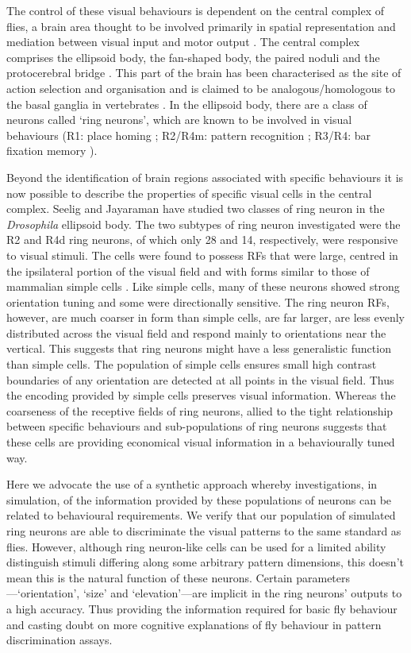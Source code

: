 The control of these visual behaviours is dependent on the central complex of flies, a brain area thought to be involved primarily in spatial representation and mediation between visual input and motor output \cite{Pfeiffer2014}.
The central complex comprises the ellipsoid body, the fan-shaped body, the paired noduli and the protocerebral bridge \cite{Young2010}.
This part of the brain has been characterised as the site of action selection and organisation and is claimed to be analogous/homologous to the basal ganglia in vertebrates \cite{Strausfeld2013}.
In the ellipsoid body, there are a class of neurons called `ring neurons', which are known to be involved in visual behaviours (R1: place homing \cite{Ofstad2011,Sitaraman2010,Sitaraman2008}; R2/R4m: pattern recognition \cite{Pan2009,Liu2006,Ernst1999}; R3/R4: bar fixation memory \cite{Neuser2008}).

Beyond the identification of brain regions associated with specific behaviours it is now possible to describe the properties of specific visual cells in the central complex. Seelig and Jayaraman \cite{Seelig2013} have studied two classes of ring neuron in the \emph{Drosophila} ellipsoid body.
The two subtypes of ring neuron investigated were the R2 and R4d ring neurons, of which only 28 and 14, respectively, were responsive to visual stimuli.
The cells were found to possess \acp{RF} that were large, centred in the ipsilateral portion of the visual field and with forms similar to those of mammalian simple cells \cite{Hubel1962}.
Like simple cells, many of these neurons showed strong orientation tuning and some were directionally sensitive.
The ring neuron \acp{RF}, however, are much coarser in form than simple cells, are far larger, are less evenly distributed across the visual field and respond mainly to orientations near the vertical.
This suggests that ring neurons might have a less generalistic function than simple cells. The population of simple cells ensures small high contrast boundaries of any orientation are detected at all points in the visual field. Thus the encoding provided by simple cells preserves visual information. Whereas the coarseness of the receptive fields of ring neurons, allied to the tight relationship between specific behaviours and sub-populations of ring neurons suggests that these cells are providing economical visual information in a behaviourally tuned way.

Here we advocate the use of a synthetic approach whereby investigations, in simulation, of the information provided by these populations of neurons can be related to behavioural requirements. We verify that our population of simulated ring neurons are able to discriminate the visual patterns to the same standard as flies.
However, although ring neuron-like cells can be used for a limited ability distinguish stimuli differing along some arbitrary pattern dimensions, this doesn't mean this is the natural function of these neurons.
Certain parameters---`orientation', `size' and `elevation'---are implicit in the ring neurons' outputs to a high accuracy. Thus providing the information required for basic fly behaviour and casting doubt on more cognitive explanations of fly behaviour in pattern discrimination assays.
 


